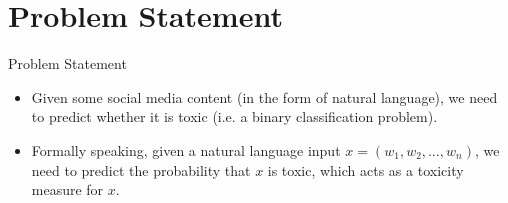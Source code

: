 \section{Problem Statement}

\begin{frame}{Problem Statement}

  \begin{itemize}
    \item Given some social media content (in the form of natural language), we need to predict whether it is toxic (i.e. a binary classification problem).
    \item Formally speaking, given a natural language input $x = (w_1, w_2, \dots, w_n)$, we need to predict the probability that $x$ is toxic, which acts as a toxicity measure for $x$.
  \end{itemize}
    
\end{frame}

